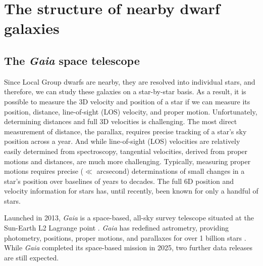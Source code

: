 \section{The structure of nearby dwarf
galaxies}\label{the-structure-of-nearby-dwarf-galaxies}

\subsection{\texorpdfstring{The \emph{Gaia} space
telescope}{The Gaia space telescope}}\label{the-gaia-space-telescope}

Since Local Group dwarfs are nearby, they are resolved into individual
stars, and therefore, we can study these galaxies on a star-by-star
basis. As a result, it is possible to measure the 3D velocity and
position of a star if we can measure its position, distance,
line-of-sight (LOS) velocity, and proper motion. Unfortunately,
determining distances and full 3D velocities is challenging. The most
direct measurement of distance, the parallax, requires precise tracking
of a star's sky position across a year. And while line-of-sight (LOS)
velocities are relatively easily determined from spectroscopy,
tangential velocities, derived from proper motions and distances, are
much more challenging. Typically, measuring proper motions requires
precise (\(\ll\) arcsecond) determinations of small changes in a star's
position over baselines of years to decades. The full 6D position and
velocity information for stars has, until recently, been known for only
a handful of stars.

Launched in 2013, \emph{Gaia} is a space-based, all-sky survey telescope
situated at the Sun-Earth L2 Lagrange point
\citep{gaiacollaboration+2016}. \emph{Gaia} has redefined astrometry,
providing photometry, positions, proper motions, and parallaxes for over
1 billion stars \citep{gaiacollaboration+2021}. While \emph{Gaia}
completed its space-based mission in 2025, two further data releases are
still expected.

